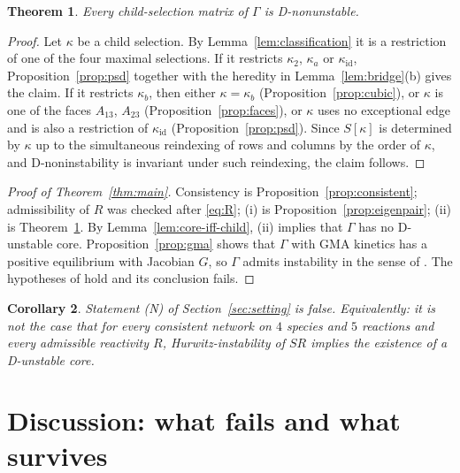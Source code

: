 \documentclass[11pt,a4paper]{article}
\newtheorem{theorem}{Theorem}[section]
\newtheorem{corollary}[theorem]{Corollary}
\theoremstyle{definition}
\theoremstyle{remark}
\begin{document}
\begin{theorem}\label{thm:allchildren}
Every child-selection matrix of $\Gamma$ is D-nonunstable.
\end{theorem}

\begin{proof}
Let $\kappa$ be a child selection. By Lemma~\ref{lem:classification} it is a restriction of one of the four maximal selections. If it restricts $\kappa_2$, $\kappa_a$ or $\kappa_{\mathrm{id}}$, Proposition~\ref{prop:psd} together with the heredity in Lemma~\ref{lem:bridge}(b) gives the claim. If it restricts $\kappa_b$, then either $\kappa=\kappa_b$ (Proposition~\ref{prop:cubic}), or $\kappa$ is one of the faces $A_{13}$, $A_{23}$ (Proposition~\ref{prop:faces}), or $\kappa$ uses no exceptional edge and is also a restriction of $\kappa_{\mathrm{id}}$ (Proposition~\ref{prop:psd}). Since $S[\kappa]$ is determined by $\kappa$ up to the simultaneous reindexing of rows and columns by the order of $\kappa$, and D-noninstability is invariant under such reindexing, the claim follows.
\end{proof}

\begin{proof}[Proof of Theorem~\ref{thm:main}]
Consistency is Proposition~\ref{prop:consistent}; admissibility of $R$ was checked after \eqref{eq:R}; (i) is Proposition~\ref{prop:eigenpair}; (ii) is Theorem~\ref{thm:allchildren}. By Lemma~\ref{lem:core-iff-child}, (ii) implies that $\Gamma$ has no D-unstable core. Proposition~\ref{prop:gma} shows that $\Gamma$ with GMA kinetics has a positive equilibrium with Jacobian $G$, so $\Gamma$ admits instability in the sense of \cite[Def.~2]{VassenaStadler2024}. The hypotheses of \cite[Conj.~17]{VassenaStadler2024} hold and its conclusion fails.
\end{proof}

\begin{corollary}\label{cor:N}
Statement \textup{(N)} of Section~\ref{sec:setting} is false. Equivalently: it is not the case that for every consistent network on $4$ species and $5$ reactions and every admissible reactivity $R$, Hurwitz-instability of $SR$ implies the existence of a D-unstable core.
\end{corollary}

\section{Discussion: what fails and what survives}\label{sec:discussion}
\end{document}
